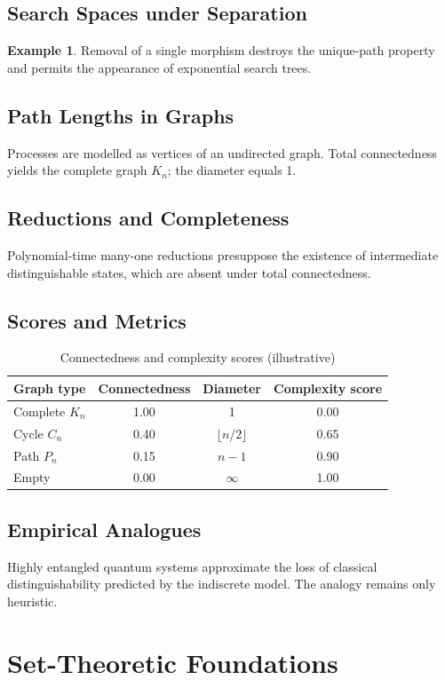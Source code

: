 \documentclass[11pt,a4paper]{article}
\theoremstyle{definition}
\newtheorem{example}[theorem]{Example}
\begin{document}
\subsection{Search Spaces under Separation}
\begin{example}
Removal of a single morphism destroys the unique-path property and permits the appearance of exponential search trees.
\end{example}

\subsection{Path Lengths in Graphs}
Processes are modelled as vertices of an undirected graph. Total connectedness yields the complete graph \(K_n\); the diameter equals 1.

\subsection{Reductions and Completeness}
Polynomial-time many-one reductions presuppose the existence of intermediate distinguishable states, which are absent under total connectedness.

\subsection{Scores and Metrics}
\begin{table}[h]
\centering
\caption{Connectedness and complexity scores (illustrative)}
\begin{tabular}{lccc}
\toprule
Graph type & Connectedness & Diameter & Complexity score \\
\midrule
Complete \(K_n\) & 1.00 & 1 & 0.00 \\
Cycle \(C_n\) & 0.40 & \(\lfloor n/2\rfloor\) & 0.65 \\
Path \(P_n\) & 0.15 & \(n-1\) & 0.90 \\
Empty & 0.00 & \(\infty\) & 1.00 \\
\bottomrule
\end{tabular}
\end{table}

\subsection{Empirical Analogues}
Highly entangled quantum systems approximate the loss of classical distinguishability predicted by the indiscrete model. The analogy remains only heuristic.
\newpage
\section{Set-Theoretic Foundations}
\end{document}

